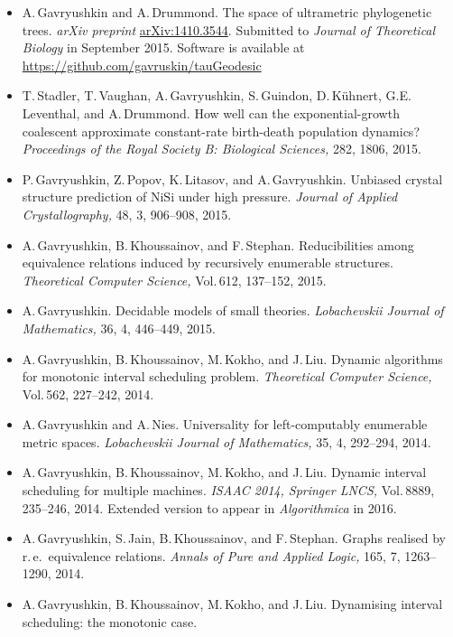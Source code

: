 \documentclass[12pt]{article}
\begin{document}
\iftoggle{full}{
\centerline{\bf Publications}
}{
\centerline{\bf Recent publications}
}
\begin{itemize}
\item A.\,Gavryushkin and A.\,Drummond.
	The space of ultrametric phylogenetic trees.
	{\em arXiv preprint} \href{http://arxiv.org/abs/1410.3544}{arXiv:1410.3544}.
	Submitted to {\em Journal of Theoretical Biology} in September 2015.
	Software is available at
	\href{https://github.com/gavruskin/tauGeodesic}{https://github.com/gavruskin/tauGeodesic}
\item T.\,Stadler, T.\,Vaughan, A.\,Gavryushkin, S.\,Guindon, D.\,K\"uhnert, G.E.\,Leventhal, and A.\,Drummond.
	How well can the exponential-growth coalescent approximate constant-rate birth-death population dynamics?
	{\em Proceedings of the Royal Society B: Biological Sciences,} 282, 1806, 2015.
\item P.\,Gavryushkin, Z.\,Popov, K.\,Litasov, and A.\,Gavryushkin.
	Unbiased crystal structure prediction of $\mathrm{NiSi}$ under high pressure.
	{\em Journal of Applied Crystallography,} 48, 3, 906--908, 2015.
\item A.\,Gavryushkin, B.\,Khoussainov, and F.\,Stephan.
	Reducibilities among equivalence relations induced by recursively enumerable structures.
	{\em Theoretical Computer Science,} Vol.\,612, 137--152, 2015.
\item A.\,Gavryushkin.
	Decidable models of small theories.
	{\em Lobachevskii Journal of Mathematics,} 36, 4, 446--449, 2015.
\item A.\,Gavryushkin, B.\,Khoussainov, M.\,Kokho, and J.\,Liu.
	Dynamic algorithms for monotonic interval scheduling problem.
	{\em Theoretical Computer Science,} Vol.\,562, 227--242, 2014.
\item A.\,Gavryushkin and A.\,Nies.
	Universality for left-computably enumerable metric spaces.
	{\em Lobachevskii Journal of Mathematics,} 35, 4, 292--294, 2014.
\item A.\,Gavryushkin, B.\,Khoussainov, M.\,Kokho, and J.\,Liu.
	Dynamic interval scheduling for multiple machines.
	{\em ISAAC 2014, Springer LNCS,} Vol.\,8889, 235--246, 2014.
	Extended version to appear in {\em Algorithmica} in 2016.
\item A.\,Gavryushkin, S.\,Jain, B.\,Khoussainov, and F.\,Stephan.
	Graphs realised by r.\,e.\ equivalence relations.
	{\em Annals of Pure and Applied Logic,} 165, 7, 1263--1290, 2014.
\item A.\,Gavryushkin, B.\,Khoussainov, M.\,Kokho, and J.\,Liu.
	Dynamising interval scheduling: the monotonic case.

\end{itemize}
\end{document}
